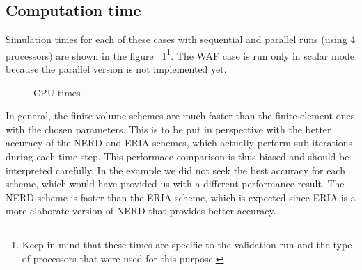 \subsection{Computation time}

Simulation times for each of these cases with sequential and parallel runs (using 4 processors) are shown in the figure ~\ref{fig:thacker:cputime}\footnote{Keep in mind that these times
are specific to the validation run and the type of processors that were used for this purpose.}.
The WAF case is run only in scalar mode because the parallel version is not implemented yet.

\begin{figure}[h!]
  \centering
  \caption{CPU times}\label{fig:thacker:cputime}
\end{figure}

In general, the finite-volume schemes are much faster than the finite-element ones with the chosen parameters.
This is to be put in perspective with the better accuracy of the NERD and ERIA schemes, which actually perform sub-iterations during each time-step.
This performace comparison is thus biased and should be interpreted carefully. In the example we did not seek the best accuracy for each scheme,
which would have provided us with a different performance result. 
The NERD scheme is faster than the ERIA scheme, which is expected since ERIA is a more elaborate version of NERD that provides better accuracy.



